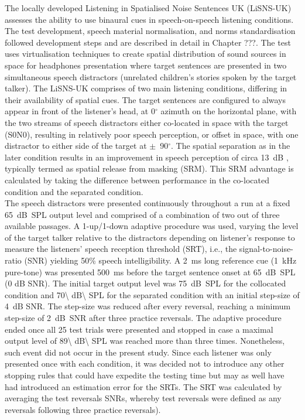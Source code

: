 \documentclass[a4paper, twoside]{templates/ociamthesis}
\begin{document}
The locally developed Listening in Spatialised Noise Sentences UK (LiSNS-UK) assesses the ability to use binaural cues in speech-on-speech listening conditions. The test development, speech material normalisation, and norms standardisation followed \textcite{Cameron2007} development steps and are described in detail in Chapter ???. The test uses virtualisation techniques to create spatial distribution of sound sources in space for headphones presentation where target sentences \autocite[ASL;][]{MacLeod1990} are presented in two simultaneous speech distractors (unrelated children's stories spoken by the target talker). The LiSNS-UK comprises of two main listening conditions, differing in their availability of spatial cues. The target sentences are configured to always appear in front of the listener's head, at 0\(^{\circ}\) azimuth on the horizontal plane, with the two streams of speech distractors either co-located in space with the target (S0N0), resulting in relatively poor speech perception, or offset in space, with one distractor to either side of the target at \(\pm\)~90\(^{\circ}\). The spatial separation as in the later condition results in an improvement in speech perception of circa 13~dB \autocite{Cameron2011}, typically termed as spatial release from masking (SRM). This SRM advantage is calculated by taking the difference between performance in the co-located condition and the separated condition.\\

The speech distractors were presented continuously throughout a run at a fixed 65~dB~SPL output level and comprised of a combination of two out of three available passages. A 1-up/1-down adaptive procedure was used, varying the level of the target talker relative to the distractors depending on listener's response to measure the listeners' speech reception threshold (SRT), i.e., the signal-to-noise-ratio (SNR) yielding 50\% speech intelligibility. A 2~ms long reference cue (1~kHz pure-tone) was presented 500~ms before the target sentence onset at 65~dB~SPL (0 dB SNR). The initial target output level was 75~dB~SPL for the collocated condition and 70\textbackslash{} dB\textbackslash{} SPL for the separated condition with an initial step-size of 4~dB SNR. The step-size was reduced after every reversal, reaching a minimum step-size of 2~dB~SNR after three practice reversals. The adaptive procedure ended once all 25 test trials were presented and stopped in case a maximal output level of 89\textbackslash{} dB\textbackslash{} SPL was reached more than three times. Nonetheless, such event did not occur in the present study. Since each listener was only presented once with each condition, it was decided not to introduce any other stopping rules that could have expedite the testing time but may as well have had introduced an estimation error for the SRTs. The SRT was calculated by averaging the test reversals SNRs, whereby test reversals were defined as any reversals following three practice reversals).\\
\end{document}
